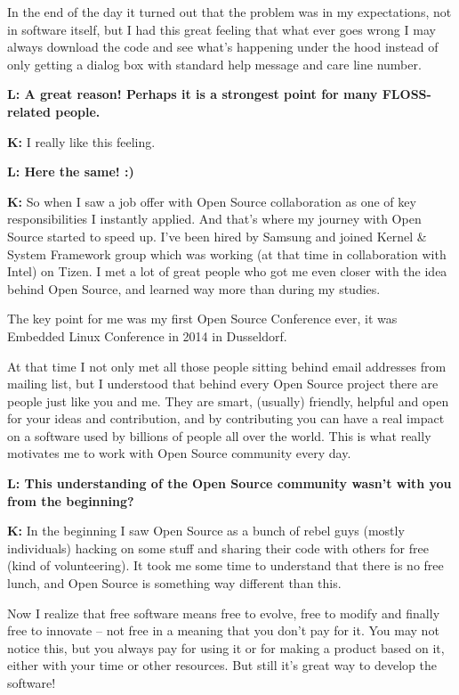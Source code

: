 \documentclass[10pt, a5paper]{article}
\begin{document}
\begin{Parallel}[p]{}{}
{In the end of the day it turned out that the problem was in my expectations, not in software itself, but I had this great feeling that what ever goes wrong I may always download the code and see what's happening under the hood instead of only getting a dialog box with standard help message and care line number.

{\noindent \bf L: A great reason! Perhaps it is a strongest point for many FLOSS-related people.}

{\noindent \bf K:} I really like this feeling.

{\noindent \bf L: Here the same! :) }

{\noindent \bf K:}  So when I saw a job offer with Open Source collaboration as one of key responsibilities I instantly applied. And that's where my journey with Open Source started to speed up.
I've been hired by Samsung and joined Kernel \& System Framework group which was working (at that time in collaboration with Intel) on Tizen.
I met a lot of great people who got me even closer with the idea behind Open Source, and learned way more than during my studies.

The key point for me was my first Open Source Conference ever, it was Embedded Linux Conference in 2014 in Dusseldorf.

At that time I not only met all those people sitting behind email addresses from mailing list, but I understood that behind every Open Source project there are people just like you and me.
They are smart, (usually) friendly, helpful and open for your ideas and contribution, and by contributing you can have a real impact on a software used by billions of people all over the world.
This is what really motivates me to work with Open Source community every day.


{\noindent \bf L: This understanding of the Open Source community wasn't with you from the beginning?}

{\noindent \bf K:} In the beginning I saw Open Source as a bunch of rebel guys (mostly individuals) hacking on some stuff and sharing their code with others for free (kind of volunteering).
It took me some time to understand that there is no free lunch, and Open Source is something way different than this.

Now I realize that free software means free to evolve, free to modify and finally free to innovate -- not free in a meaning that you don't pay for it. 
You may not notice this, but you always pay for using it or for making a product based on it, either with your time or other resources.
But still it's great way to develop the software!

}
\end{Parallel}
\end{document}
